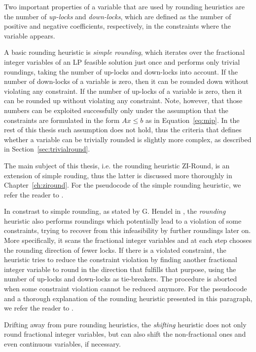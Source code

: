 \documentclass[a4paper,12pt,twoside]{scrbook}
\begin{document}
Two important properties of a variable that are used by rounding heuristics are the number of \textit{up-locks} and \textit{down-locks}, which are defined as the number of positive and negative coefficients, respectively, in the constraints where the variable appears. \par 
A basic rounding heuristic is \textit{simple rounding}, which iterates over the fractional integer variables of an LP feasible solution just once and performs only trivial roundings, taking the number of up-locks and down-locks into account. If the number of down-locks of a variable is zero, then it can be rounded down without violating any constraint. If the number of up-locks of a variable is zero, then it can be rounded up without violating any constraint.
Note, however, that those numbers can be exploited successfully only under the assumption that the constraints are formulated in the form $Ax \leq b$ as in Equation~\ref{eq:mip}. In the rest of this thesis such assumption does not hold, thus the criteria that defines whether a variable can be trivially rounded is slightly more complex, as described in Section~\ref{sec:trivialround}. \par 
The main subject of this thesis, i.e. the rounding heuristic ZI-Round, is an extension of simple rouding, thus the latter is discussed more thoroughly in Chapter~\ref{ch:ziround}. For the pseudocode of the simple rounding heuristic, we refer the reader to \cite{berthold2006}. \par 
In constrast to simple rounding, as stated by G. Hendel in \cite{hendel2011}, the \textit{rounding} heuristic also performs roundings which potentially lead to a violation of some constraints, trying to recover from this infeasibility by further roundings later on. More specifically, it scans the fractional integer variables and at each step chooses the rounding direction of fewer locks. If there is a violated constraint, the heuristic tries to reduce the constraint violation by finding another fractional integer variable to round in the direction that fulfills that purpose, using the number of up-locks and down-locks as tie-breakers. The procedure is aborted when some constraint violation cannot be reduced anymore. For the pseudocode and a thorough explanation of the rounding heuristic presented in this paragraph, we refer the reader to \cite{berthold2006}. \par
Drifting away from pure rounding heuristics, the \textit{shifting} heuristic does not only round fractional integer variables, but can also shift the non-fractional ones and even continuous variables, if necessary.
\end{document}
